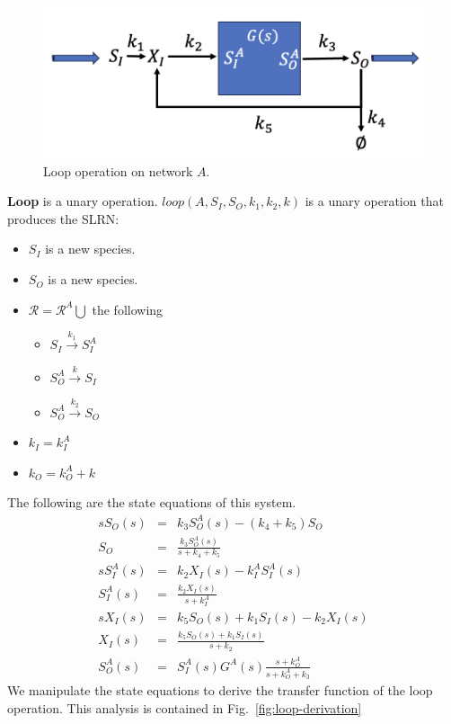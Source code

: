 \documentclass[unnumsec,webpdf,contemporary,large]{oup-authoring-template}%
\theoremstyle{thmstyleone}%
\theoremstyle{thmstyletwo}%
\theoremstyle{thmstylethree}%
\begin{document}
\begin{figure}
         \centering
         \includegraphics[scale=0.4]{figures/loop.png}
          \caption[]{Loop operation on network $A$.}
         \label{fig:concatenate}
\end{figure}
{\bf Loop} is a unary operation.
$loop(A, S_I, S_O, k_1, k_2, k)$ is a unary operation that produces
the SLRN:
\begin{itemize}
\item $S_I$ is a new species.
\item $S_O$ is a new species.
\item $\mathcal{R} = \mathcal{R}^A \bigcup$ the following
\begin{itemize}
\item $S_I \xrightarrow{k_1} S^A_I$
\item $S^A_O \xrightarrow{k} S_I$
\item $S^A_O \xrightarrow{k_2} S_O$
\end{itemize}
\item $k_I = k^A_I$
\item $k_O = k^A_O + k$
\end{itemize}

The following are the state equations of this system.
\begin{eqnarray}
s S_O (s) & = & k_3 S^A_O (s) - (k_4 + k_5) S_O \nonumber \\
S_O & = & \frac{k_3 S^A_O(s)}{s + k_4 + k_5} \\
s S^A_I(s) & = & k_2 X_I(s) - k^A_I S^A_I(s) \nonumber \\
S^A_I(s) & = & \frac{k_2 X_I(s)}{s + k^A_I} \\
s X_I (s) & = & k_5 S_O(s) + k_1 S_I (s) - k_2 X_I (s) \nonumber \\
X_I(s) & = & \frac{k_5 S_O(s) + k_1 S_I (s)}{s + k_2} \\
S^A_O(s) & = & S^A_I(s) G^A(s) \frac{s + k^A_O}{s + k^A_O + k_3}
\end{eqnarray}
We manipulate the state equations to derive the transfer function of
the loop operation.
This analysis is contained in
Fig.~\ref{fig:loop-derivation}
\end{document}

